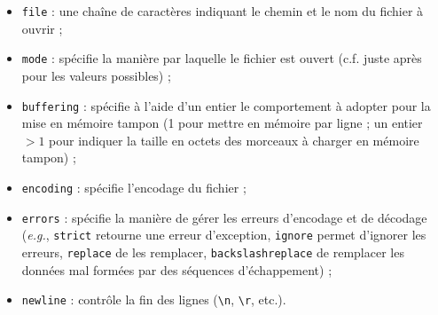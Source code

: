 \documentclass[12pt,]{book}
\providecommand{\tightlist}{%
  \setlength{\itemsep}{0pt}\setlength{\parskip}{0pt}}
\numberwithin{equation}{section}
\numberwithin{countremarque}{section}
\begin{document}
\begin{itemize}
\tightlist
\item
  \texttt{file} : une chaîne de caractères indiquant le chemin et le nom
  du fichier à ouvrir ;
\item
  \texttt{mode} : spécifie la manière par laquelle le fichier est ouvert
  (c.f. juste après pour les valeurs possibles) ;
\item
  \texttt{buffering} : spécifie à l'aide d'un entier le comportement à
  adopter pour la mise en mémoire tampon (1 pour mettre en mémoire par
  ligne ; un entier \(>1\) pour indiquer la taille en octets des
  morceaux à charger en mémoire tampon) ;
\item
  \texttt{encoding} : spécifie l'encodage du fichier ;
\item
  \texttt{errors} : spécifie la manière de gérer les erreurs d'encodage
  et de décodage (\emph{e.g.}, \texttt{strict} retourne une erreur
  d'exception, \texttt{ignore} permet d'ignorer les erreurs,
  \texttt{replace} de les remplacer, \texttt{backslashreplace} de
  remplacer les données mal formées par des séquences d'échappement) ;
\item
  \texttt{newline} : contrôle la fin des lignes
  (\texttt{\textbackslash{}n}, \texttt{\textbackslash{}r}, etc.).
\end{itemize}
\end{document}
